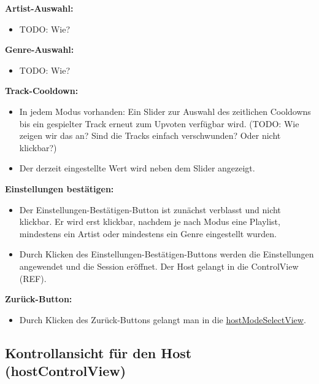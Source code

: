 \documentclass[oneside, ngerman]{sdqtechreport}
\begin{document}
\textbf{Artist-Auswahl:}
\begin{itemize}
    \item TODO: Wie?
\end{itemize}

\textbf{Genre-Auswahl:}
\begin{itemize}
    \item TODO: Wie?
\end{itemize}

\textbf{Track-Cooldown:}
\begin{itemize}
    \item In jedem Modus vorhanden: Ein Slider zur Auswahl des zeitlichen Cooldowns bis ein gespielter Track erneut zum Upvoten verfügbar wird. (TODO: Wie zeigen wir das an? Sind die Tracks einfach verschwunden? Oder nicht klickbar?)
    \item Der derzeit eingestellte Wert wird neben dem Slider angezeigt.
\end{itemize}

\textbf{Einstellungen bestätigen:}
\begin{itemize}
    \item Der Einstellungen-Bestätigen-Button ist zunächst verblasst und nicht klickbar. Er wird erst klickbar, nachdem je nach Modus eine Playlist, mindestens ein Artist oder mindestens ein Genre eingestellt wurden.
    \item Durch Klicken des Einstellungen-Bestätigen-Buttons werden die Einstellungen angewendet und die Session eröffnet. Der Host gelangt in die ControlView (REF).
\end{itemize}

\textbf{Zurück-Button:}
\begin{itemize}
    \item Durch Klicken des Zurück-Buttons gelangt man in die  \hyperlink{hostModeSelectView}{hostModeSelectView}.
\end{itemize}


\subsection{Kontrollansicht für den Host (hostControlView)}
\label{sec:Benutzeroberfläche:joinSessionView}
\end{document}
